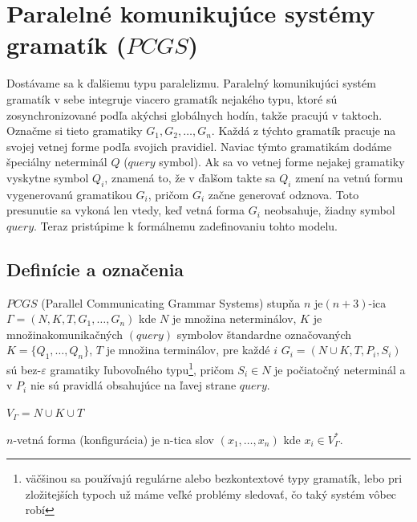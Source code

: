 \chapter{Paralelné komunikujúce systémy gramatík ($PCGS$)}

Dostávame sa k ďalšiemu typu paralelizmu. Paralelný komunikujúci
systém gramatík v sebe integruje viacero gramatík nejakého typu,
ktoré sú zosynchronizované podľa akýchsi globálnych hodín, takže
pracujú v taktoch. Označme si tieto gramatiky $G_1,G_2,\dots
,G_n$. Každá z týchto gramatík pracuje na svojej vetnej forme
podľa svojich pravidiel. Naviac týmto gramatikám dodáme špeciálny
neterminál $Q$ ($query$ symbol). Ak sa vo vetnej forme nejakej
gramatiky vyskytne symbol $Q_i$, znamená to, že v ďalšom takte sa
$Q_i$ zmení na vetnú formu vygenerovanú gramatikou $G_i$, pričom
$G_i$ začne generovať odznova. Toto presunutie sa vykoná len
vtedy, keď vetná forma $G_i$ neobsahuje, žiadny symbol $query$.
Teraz pristúpime k formálnemu zadefinovaniu tohto modelu.

\section{Definície a označenia}

\begin{definicia}
  $PCGS$ (Parallel Communicating Grammar Systems) stupňa $n$
  je\newline $(n+3)$-ica $\Gamma =(N,K,T,G_1,\dots ,G_n)$ kde $N$ je
  množina neterminálov, $K$ je množina\linebreak komunikačných
  \mbox{$(query)$} symbolov štandardne označovaných $K=\{Q_1,\dots
  ,Q_n\}$, $T$ je množina terminálov, pre každé $i$ $G_i=(N\cup
  K,T,P_i,S_i)$ sú bez-$\varepsilon$ gramatiky ľubovoľného
  typu\footnote{väčšinou sa používajú regulárne alebo bezkontextové
  typy gramatík, lebo pri zložitejších typoch už máme veľké problémy
  sledovať, čo taký systém vôbec robí}, pričom $S_i\in N$ je
  počiatočný neterminál a v $P_i$ nie sú pravidlá obsahujúce na
  ľavej strane $query$.
\end{definicia}

\begin{oznacenie}
  $V_\Gamma=N\cup K\cup T$
\end{oznacenie}

\begin{definicia}
  $n$-vetná forma (konfigurácia) je n-tica slov $(x_1,\dots ,x_n)$
  kde $x_i\in V_\Gamma^*$.
\end{definicia}

